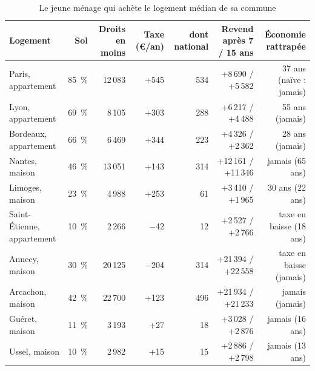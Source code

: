 \documentclass[11pt,a4paper]{article}
\begin{document}
\begin{table}[!htbp]\centering\scriptsize
\caption{Le jeune ménage qui achète le logement médian de sa commune}\label{tab:fon_primo}
\setlength{\tabcolsep}{4pt}
\begin{tabularx}{\linewidth}{@{}>{\raggedright\arraybackslash}X rrrrrr@{}}
\toprule
Logement & Sol & Droits en moins & Taxe (€/an) & dont national & Revend après 7 / 15 ans & Économie rattrapée \\
\midrule
Paris, appartement & 85~\% & 12\,083 & +545 & 534 & +8\,690 / +5\,582 & 37 ans (naïve : jamais) \\
Lyon, appartement & 69~\% & 8\,105 & +303 & 288 & +6\,217 / +4\,488 & 55 ans (jamais) \\
Bordeaux, appartement & 66~\% & 6\,469 & +344 & 223 & +4\,326 / +2\,362 & 28 ans (jamais) \\
Nantes, maison & 46~\% & 13\,051 & +143 & 314 & +12\,161 / +11\,346 & jamais (65 ans) \\
Limoges, maison & 23~\% & 4\,988 & +253 & 61 & +3\,410 / +1\,965 & 30 ans (22 ans) \\
Saint-Étienne, appartement & 10~\% & 2\,266 & $-$42 & 12 & +2\,527 / +2\,766 & taxe en baisse (18 ans) \\
Annecy, maison & 30~\% & 20\,125 & $-$204 & 314 & +21\,394 / +22\,558 & taxe en baisse (jamais) \\
Arcachon, maison & 42~\% & 22\,700 & +123 & 496 & +21\,934 / +21\,233 & jamais (jamais) \\
Guéret, maison & 11~\% & 3\,193 & +27 & 18 & +3\,028 / +2\,876 & jamais (16 ans) \\
Ussel, maison & 10~\% & 2\,982 & +15 & 15 & +2\,886 / +2\,798 & jamais (13 ans) \\
\bottomrule
\end{tabularx}
\par\vspace{2pt}{\raggedright\scriptsize En euros ; taxe de 2025, droits au taux permanent, logement médian aux prix de
2023-2024, sans effet sur les prix. Revend : économie de droits moins la valeur actuelle (3~\%) de la hausse de taxe
payée pendant la détention. Économie rattrapée : durée au bout de laquelle la hausse actualisée égale l'économie
(« jamais » si la hausse perpétuelle actualisée reste inférieure) ; entre parenthèses, la réforme naïve. Une famille
nantaise qui passe d'un appartement à une maison de 450\,000~€ paie 13\,050~€ de droits au lieu de 26\,100~€.\par}
\end{table}
\end{document}
